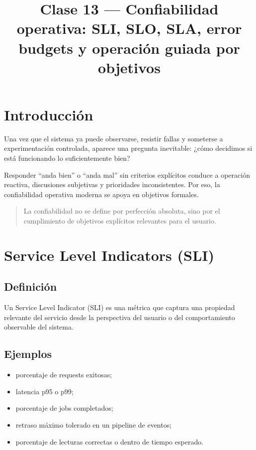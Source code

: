 \documentclass[variant=apuntes,cover=institutional,mode=screen]{ua-engineering-v6-article}
\title{Clase 13 --- Confiabilidad operativa: SLI, SLO, SLA, error budgets y operación guiada por objetivos}
\author{\UAProfessor}
\date{\UADate}
\begin{document}
\maketitle

\section{Introducción}

Una vez que el sistema ya puede observarse, resistir fallas y someterse a experimentación controlada, aparece una pregunta inevitable: ¿cómo decidimos si está funcionando lo suficientemente bien?

Responder “anda bien” o “anda mal” sin criterios explícitos conduce a operación reactiva, discusiones subjetivas y prioridades inconsistentes. Por eso, la confiabilidad operativa moderna se apoya en objetivos formales.

\begin{quote}
La confiabilidad no se define por perfección absoluta, sino por el cumplimiento de objetivos explícitos relevantes para el usuario.
\end{quote}

\section{Service Level Indicators (SLI)}

\subsection{Definición}

Un Service Level Indicator (SLI) es una métrica que captura una propiedad relevante del servicio desde la perspectiva del usuario o del comportamiento observable del sistema.

\subsection{Ejemplos}

\begin{itemize}
\item porcentaje de requests exitosas;
\item latencia p95 o p99;
\item porcentaje de jobs completados;
\item retraso máximo tolerado en un pipeline de eventos;
\item porcentaje de lecturas correctas o dentro de tiempo esperado.
\end{itemize}
\end{document}
